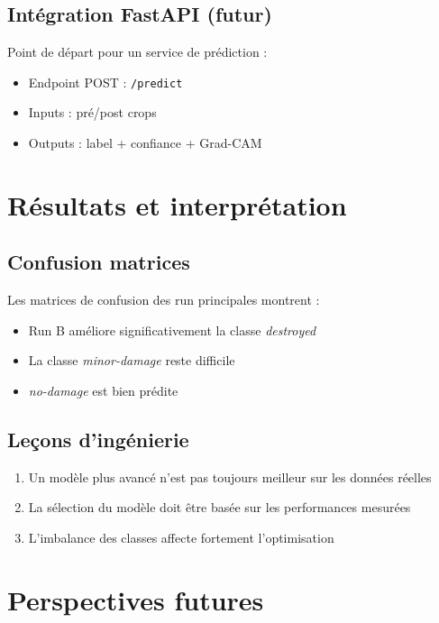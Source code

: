 \documentclass[12pt,a4paper]{article}
\begin{document}
\subsection{Intégration FastAPI (futur)}
Point de départ pour un service de prédiction :
\begin{itemize}
    \item Endpoint POST : \texttt{/predict}
    \item Inputs : pré/post crops
    \item Outputs : label + confiance + Grad-CAM
\end{itemize}

\newpage

\section{Résultats et interprétation}

\subsection{Confusion matrices}
Les matrices de confusion des run principales montrent :
\begin{itemize}
    \item Run B améliore significativement la classe \textit{destroyed}
    \item La classe \textit{minor-damage} reste difficile
    \item \textit{no-damage} est bien prédite
\end{itemize}

\subsection{Leçons d'ingénierie}
\begin{enumerate}
    \item Un modèle plus avancé n'est pas toujours meilleur sur les données réelles
    \item La sélection du modèle doit être basée sur les performances mesurées
    \item L'imbalance des classes affecte fortement l'optimisation
\end{enumerate}

\newpage

\section{Perspectives futures}
\end{document}
